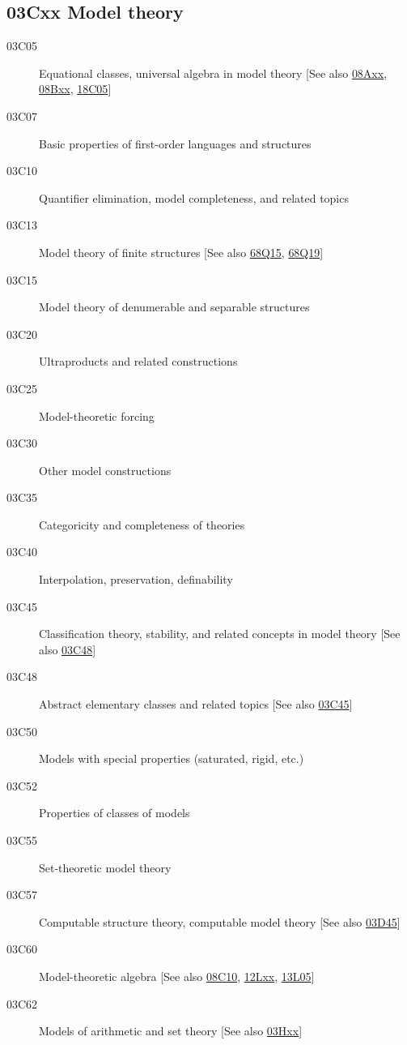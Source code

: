 \subsection*{03Cxx  Model theory }\label{03Cxx}
\begin{description} 
\item [03C05]\label{03C05} Equational classes, universal algebra in model theory [See also \hyperref[08Axx]{08Axx}, \hyperref[08Bxx]{08Bxx}, \hyperref[18C05]{18C05}]
\item [03C07]\label{03C07} Basic properties of first-order languages and structures
\item [03C10]\label{03C10} Quantifier elimination, model completeness, and related topics
\item [03C13]\label{03C13} Model theory of finite structures [See also \hyperref[68Q15]{68Q15}, \hyperref[68Q19]{68Q19}]
\item [03C15]\label{03C15} Model theory of denumerable and separable structures
\item [03C20]\label{03C20} Ultraproducts and related constructions
\item [03C25]\label{03C25} Model-theoretic forcing
\item [03C30]\label{03C30} Other model constructions
\item [03C35]\label{03C35} Categoricity and completeness of theories
\item [03C40]\label{03C40} Interpolation, preservation, definability
\item [03C45]\label{03C45} Classification theory, stability, and related concepts in model theory [See also \hyperref[03C48]{03C48}]
\item [03C48]\label{03C48} Abstract elementary classes and related topics [See also \hyperref[03C45]{03C45}]
\item [03C50]\label{03C50} Models with special properties (saturated, rigid, etc.)
\item [03C52]\label{03C52} Properties of classes of models
\item [03C55]\label{03C55} Set-theoretic model theory
\item [03C57]\label{03C57} Computable structure theory, computable model theory [See also \hyperref[03D45]{03D45}]
\item [03C60]\label{03C60} Model-theoretic algebra [See also \hyperref[08C10]{08C10}, \hyperref[12Lxx]{12Lxx}, \hyperref[13L05]{13L05}]
\item [03C62]\label{03C62} Models of arithmetic and set theory [See also \hyperref[03Hxx]{03Hxx}]

\end{description}

